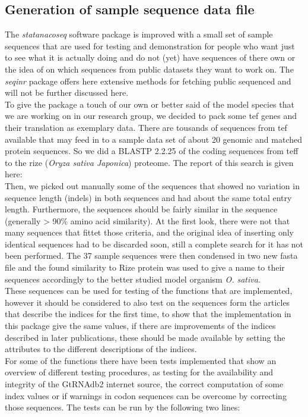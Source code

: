 \subsection{Generation of sample sequence data file}
The \textit{statanacoseq} software package is improved with a small set of sample sequences that are used for testing and demonstration for people who want just to see what it is actually doing and do not (yet) have sequences of there own or the idea of on which sequences from public datasets they want to work on. The \textit{seqinr} package offers here extensive methods for fetching public sequenced and will not be further discussed here. \\
To give the package a touch of our own or better said of the model species that we are working on in our research group, we decided to pack some tef genes and their translation as exemplary data. There are tousands of sequences from tef available that may feed in to a sample data set of about 20 genomic and matched protein sequences. So we did a BLASTP 2.2.25 of the coding sequences from teff to the rize (\textit{Oryza sativa Japonica}) proteome. The report of this search is given here:\\
  
Then, we picked out manually some of the sequences that showed no variation in sequence length (indels) in both sequences and had about the same total entry length. Furthermore, the sequences should be fairly similar in the sequence (generally > 90\% amino acid similarity). At the first look, there were not that many sequences that fittet those criteria, and the original idea of inserting only identical sequences had to be discarded soon, still a complete search for it has not been performed. The 37 sample sequences were then condensed in two new fasta file and the found similarity to Rize protein was used to give a name to their sequences accordingly to the better studied model organism \textit{O. sativa}. \\
These sequences can be used for testing of the functions that are implemented, however it should be considered to also test on the sequences form the articles that describe the indices for the first time, to show that the implementation in this package give the same values, if there are improvements of the indices described in later publications, these should be made available by setting the attributes to the different descriptions of the indices. \\
For some of the functions there have been tests implemented that show an overview of different testing procedures, as testing for the availability and integrity of the GtRNAdb2 internet source, the correct computation of some index values or if warnings in codon sequences can be overcome by correcting those sequences. The tests can be run by the following two lines:
  

